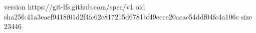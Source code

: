 version https://git-lfs.github.com/spec/v1
oid sha256:41a3eaef9418f01d2f4fc62c817215d6781bf49ecce20acac54ddf04fc4a106c
size 23446
